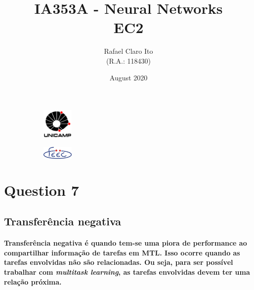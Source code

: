 \documentclass[a4paper]{article}    %
\begin{document}
\begin{figure}
    \centering
    \begin{subfigure}{0.45\textwidth}
        \centering
        \includegraphics[width=1.5cm]{unicamp}
    \end{subfigure}
    \hfill
    \begin{subfigure}{0.45\textwidth}
        \centering
        \includegraphics[width=1.5cm]{feec}
    \end{subfigure}
\end{figure}

\title{
    \vspace{5cm}
    IA353A - Neural Networks\\
    EC2
    \vspace{1cm}
}
\author{
    Rafael Claro Ito\\
    (R.A.: 118430)
    \vspace{11cm}
}
\date{August 2020}
\maketitle
\newpage

\setcounter{section}{7}
\section*{Question 7}

\subsection{Transferência negativa}
\paragraph{Transferência negativa é quando tem-se uma piora de performance ao compartilhar informação de tarefas em MTL. Isso ocorre quando as tarefas envolvidas não são relacionadas. Ou seja, para ser possível trabalhar com \emph{multitask learning}, as tarefas envolvidas devem ter uma relação próxima.}
\end{document}
